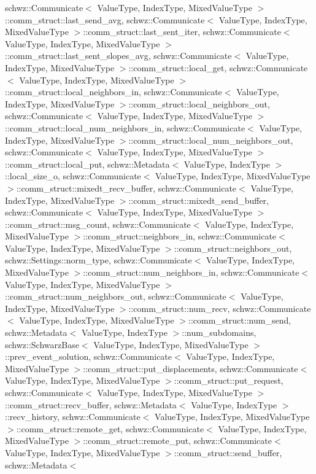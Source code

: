 schwz\+::\+Communicate$<$ Value\+Type, Index\+Type, Mixed\+Value\+Type $>$\+::comm\+\_\+struct\+::last\+\_\+send\+\_\+avg, schwz\+::\+Communicate$<$ Value\+Type, Index\+Type, Mixed\+Value\+Type $>$\+::comm\+\_\+struct\+::last\+\_\+sent\+\_\+iter, schwz\+::\+Communicate$<$ Value\+Type, Index\+Type, Mixed\+Value\+Type $>$\+::comm\+\_\+struct\+::last\+\_\+sent\+\_\+slopes\+\_\+avg, schwz\+::\+Communicate$<$ Value\+Type, Index\+Type, Mixed\+Value\+Type $>$\+::comm\+\_\+struct\+::local\+\_\+get, schwz\+::\+Communicate$<$ Value\+Type, Index\+Type, Mixed\+Value\+Type $>$\+::comm\+\_\+struct\+::local\+\_\+neighbors\+\_\+in, schwz\+::\+Communicate$<$ Value\+Type, Index\+Type, Mixed\+Value\+Type $>$\+::comm\+\_\+struct\+::local\+\_\+neighbors\+\_\+out, schwz\+::\+Communicate$<$ Value\+Type, Index\+Type, Mixed\+Value\+Type $>$\+::comm\+\_\+struct\+::local\+\_\+num\+\_\+neighbors\+\_\+in, schwz\+::\+Communicate$<$ Value\+Type, Index\+Type, Mixed\+Value\+Type $>$\+::comm\+\_\+struct\+::local\+\_\+num\+\_\+neighbors\+\_\+out, schwz\+::\+Communicate$<$ Value\+Type, Index\+Type, Mixed\+Value\+Type $>$\+::comm\+\_\+struct\+::local\+\_\+put, schwz\+::\+Metadata$<$ Value\+Type, Index\+Type $>$\+::local\+\_\+size\+\_\+o, schwz\+::\+Communicate$<$ Value\+Type, Index\+Type, Mixed\+Value\+Type $>$\+::comm\+\_\+struct\+::mixedt\+\_\+recv\+\_\+buffer, schwz\+::\+Communicate$<$ Value\+Type, Index\+Type, Mixed\+Value\+Type $>$\+::comm\+\_\+struct\+::mixedt\+\_\+send\+\_\+buffer, schwz\+::\+Communicate$<$ Value\+Type, Index\+Type, Mixed\+Value\+Type $>$\+::comm\+\_\+struct\+::msg\+\_\+count, schwz\+::\+Communicate$<$ Value\+Type, Index\+Type, Mixed\+Value\+Type $>$\+::comm\+\_\+struct\+::neighbors\+\_\+in, schwz\+::\+Communicate$<$ Value\+Type, Index\+Type, Mixed\+Value\+Type $>$\+::comm\+\_\+struct\+::neighbors\+\_\+out, schwz\+::\+Settings\+::norm\+\_\+type, schwz\+::\+Communicate$<$ Value\+Type, Index\+Type, Mixed\+Value\+Type $>$\+::comm\+\_\+struct\+::num\+\_\+neighbors\+\_\+in, schwz\+::\+Communicate$<$ Value\+Type, Index\+Type, Mixed\+Value\+Type $>$\+::comm\+\_\+struct\+::num\+\_\+neighbors\+\_\+out, schwz\+::\+Communicate$<$ Value\+Type, Index\+Type, Mixed\+Value\+Type $>$\+::comm\+\_\+struct\+::num\+\_\+recv, schwz\+::\+Communicate$<$ Value\+Type, Index\+Type, Mixed\+Value\+Type $>$\+::comm\+\_\+struct\+::num\+\_\+send, schwz\+::\+Metadata$<$ Value\+Type, Index\+Type $>$\+::num\+\_\+subdomains, schwz\+::\+Schwarz\+Base$<$ Value\+Type, Index\+Type, Mixed\+Value\+Type $>$\+::prev\+\_\+event\+\_\+solution, schwz\+::\+Communicate$<$ Value\+Type, Index\+Type, Mixed\+Value\+Type $>$\+::comm\+\_\+struct\+::put\+\_\+displacements, schwz\+::\+Communicate$<$ Value\+Type, Index\+Type, Mixed\+Value\+Type $>$\+::comm\+\_\+struct\+::put\+\_\+request, schwz\+::\+Communicate$<$ Value\+Type, Index\+Type, Mixed\+Value\+Type $>$\+::comm\+\_\+struct\+::recv\+\_\+buffer, schwz\+::\+Metadata$<$ Value\+Type, Index\+Type $>$\+::recv\+\_\+history, schwz\+::\+Communicate$<$ Value\+Type, Index\+Type, Mixed\+Value\+Type $>$\+::comm\+\_\+struct\+::remote\+\_\+get, schwz\+::\+Communicate$<$ Value\+Type, Index\+Type, Mixed\+Value\+Type $>$\+::comm\+\_\+struct\+::remote\+\_\+put, schwz\+::\+Communicate$<$ Value\+Type, Index\+Type, Mixed\+Value\+Type $>$\+::comm\+\_\+struct\+::send\+\_\+buffer, schwz\+::\+Metadata$<$ 